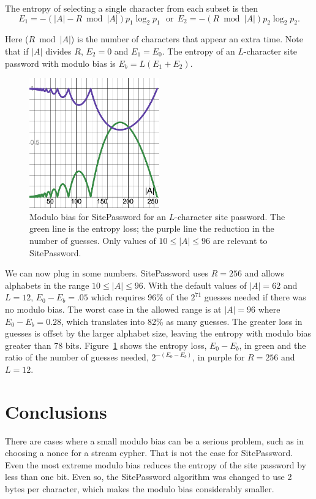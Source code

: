 \documentclass[11pt, oneside]{article}   	%
\begin{document}
The entropy of selecting a single character from each subset is then
\begin{equation}
E_1 = -(|A| - R \bmod |A]) p_1 \log_2 p_1 ~~~\textrm{or}~~ E_2 = - (R \bmod |A|) p_2 \log_2 p_2.
\end{equation}

Here ($R \bmod|A|$) is the number of characters that appear an extra time.  Note that if $|A|$ divides $R$, $E_2 = 0$ and $E_1 = E_0$.  The entropy of an $L$-character site password with modulo bias is $E_b = L(E_1 + E_2)$.  

\begin{figure}
    \centering
    \includegraphics[width=0.5\textwidth]{moduloBias.png} 
    \caption{Modulo bias for SitePassword for an $L$-character site password.  The green line is the entropy loss; the purple line the reduction in the number of guesses.  Only values of $10 \leq |A| \leq 96$ are relevant to SitePassword.}
    \label{fig}
\end{figure}

We can now plug in some numbers.  SitePassword uses $R = 256$ and allows alphabets in the range $10 \leq |A| \leq 96$.  With the default values of $|A| = 62$ and $L = 12$, $E_0 - E_b = .05$ which requires 96\% of the $2^{71}$ guesses needed if there was no modulo bias.  The worst case in the allowed range is at $|A| = 96$ where $E_0 - E_b = 0.28$, which translates into 82\% as many guesses.  The greater loss in guesses is offset by the larger alphabet size, leaving the entropy with modulo bias greater than 78 bits.  Figure~\ref{fig} shows the entropy loss, $E_0 - E_b$, in green and the ratio of the number of guesses needed, $2^{-(E_0-E_b)}$, in purple for $R = 256$ and $L = 12$.

\section{Conclusions}

There are cases where a small modulo bias can be a serious problem, such as in choosing a nonce for a stream cypher.  That is not the case for SitePassword.  Even the most extreme modulo bias reduces the entropy of the site password by less than one bit.  Even so, the SitePassword algorithm was changed to use 2 bytes per character, which makes the modulo bias considerably smaller.
\end{document}
